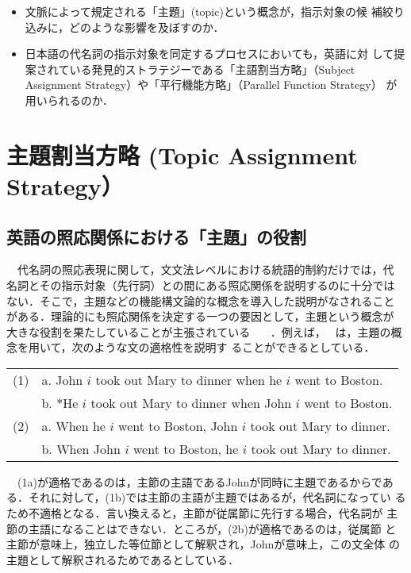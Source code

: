 \begin{itemize}
  \item 文脈によって規定される「主題」(topic)という概念が，指示対象の候
  補絞り込みに，どのような影響を及ぼすのか．
  \item 日本語の代名詞の指示対象を同定するプロセスにおいても，英語に対
  して提案されている発見的ストラテジーである「主語割当方略」（Subject
  Assignment Strategy）や「平行機能方略」（Parallel Function Strategy）
  が用いられるのか．
\end{itemize}

\section{主題割当方略 (Topic Assignment Strategy）}

\subsection{英語の照応関係における「主題」の役割}
　代名詞の照応表現に関して，文文法レベルにおける統語的制約だけでは，代
名詞とその指示対象（先行詞）との間にある照応関係を説明するのに十分では
ない．そこで，主題などの機能構文論的な概念を導入した説明がなされること
がある．理論的にも照応関係を決定する一つの要因として，主題という概念が
大きな役割を果たしていることが主張されている~
\cite{takami:1997}~\cite{takami:1987}~\cite{kanzaki:1994}．例えば，~
\cite{takami:1997}は，主題の概念を用いて，次のような文の適格性を説明す
ることができるとしている．


\vspace{3mm}
\begin{tabular}{cl}
(1)& a. John $i$ took out Mary to dinner when he $i$ went to Boston.\\

   & b. $*$He $i$ took out Mary to dinner when John $i$ went to Boston.\\
(2)& a. When he  $i$ went to Boston, John $i$ took out Mary to dinner.\\
   & b. When John $i$ went to Boston, he $i$ took out Mary to  dinner.\\
\end{tabular}
\vspace{-2mm}
\begin{flushright}
\cite{takami:1997}
\end{flushright}

　(1a)が適格であるのは，主節の主語であるJohnが同時に主題であるからであ
る．それに対して，(1b)では主節の主語が主題ではあるが，代名詞になってい
るため不適格となる．言い換えると，主節が従属節に先行する場合，代名詞が
主節の主語になることはできない．ところが，(2b)が適格であるのは，従属節
と主節が意味上，独立した等位節として解釈され，Johnが意味上，この文全体
の主題として解釈されるためであるとしている．

